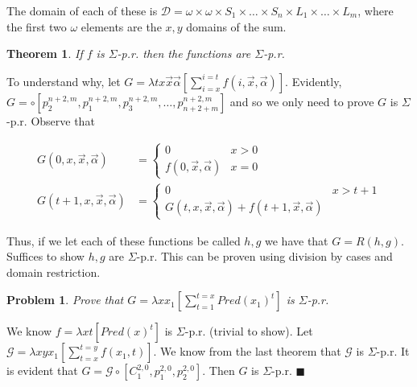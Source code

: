 \documentclass[a4paper, 12pt]{article}
\newtheorem{problem}{Problem}
\newtheorem{theorem}{Theorem}
\newtheorem{problem}{Problem}
\newtheorem{theorem}{Theorem}
\begin{document}
The domain of each of these is $\mathcal{D} = \omega \times  \omega \times S_1
\times\ldots \times S_n \times L_1 \times  \ldots \times L_m$, where the first
two $\omega$ elements are the $x, y$ domains of the sum.

\begin{theorem}
    If $f$ is $\Sigma$-p.r. then the functions are $\Sigma$-p.r.
\end{theorem}

To understand why, let $G = \lambda tx \overrightarrow{x}\overrightarrow{\alpha}
\left[\sum_{i=x}^{i=t} f(i, \overrightarrow{x},
\overrightarrow{\alpha})\right]$. Evidently, $G = \circ \left[ p_2^{n+2, m},
p_1^{n + 2, m}, p_3^{n+2, m}, \ldots, p_{n+2+m}^{n+2, m} \right] $ and so we
only need to prove $G$ is $\Sigma$-p.r. Observe that 

\begin{align*}
    G(0, x, \overrightarrow{x}, \overrightarrow{\alpha}) &= \begin{cases}
        0 & x > 0 \\ 
        f(0, \overrightarrow{x}, \overrightarrow{\alpha}) & x = 0
    \end{cases} \\ 
    G(t + 1, x, \overrightarrow{x}, \overrightarrow{\alpha}) &= \begin{cases}
        0 & x > t  +1 \\ 
        G(t, x, \overrightarrow{x}, \overrightarrow{\alpha}) + f(t+1,
        \overrightarrow{x}, \overrightarrow{\alpha})
    \end{cases}
\end{align*}

Thus, if we let each of these functions be called $h, g$ we have that $G = R(h,
g)$. Suffices to show $h, g$ are $\Sigma$-p.r. This can be proven using
division by cases and domain restriction.

\begin{problem}
    Prove that $G = \lambda x x_1 \left[ \sum_{t=1}^{t=x} Pred(x_1)^t \right] $ is
    $\Sigma$-p.r.
\end{problem}

We know $f = \lambda xt \left[ Pred(x)^t \right] $ is $\Sigma$-p.r. (trivial to
show). Let $\mathcal{G} = \lambda xy x_1 \left[ \sum_{t=x}^{t=y} f(x_1, t)
\right] $. We know from the last theorem that $\mathcal{G}$ is $\Sigma$-p.r. It
is evident that $G = \mathcal{G} \circ
\left[ C_1^{2, 0}, p_{1}^{2, 0}, p_{2}^{2, 0} \right] $. Then $G$ is
$\Sigma$-p.r. $\blacksquare$
\end{document}

